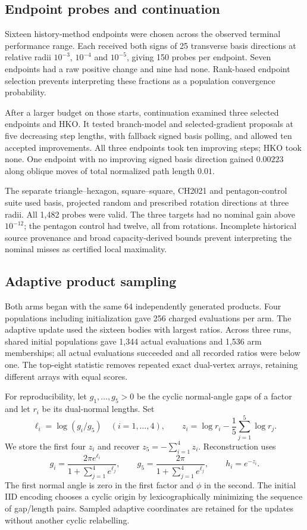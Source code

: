 \subsection{Endpoint probes and continuation}\label{app:ds-probes}

Sixteen history-method endpoints were chosen across the observed terminal
performance range. Each received both signs of 25 transverse basis
directions at relative radii $10^{-3}$, $10^{-4}$ and $10^{-5}$, giving
150 probes per endpoint. Seven endpoints had a raw positive change and
nine had none. Rank-based endpoint selection prevents interpreting these
fractions as a population convergence probability.

After a larger budget on those starts, continuation examined three
selected endpoints and HKO. It tested branch-model and selected-gradient
proposals at five decreasing step lengths, with fallback signed basis
polling, and allowed ten accepted improvements. All three endpoints took
ten improving steps; HKO took none. One endpoint with no improving signed
basis direction gained $0.00223$ along oblique moves of total normalized
path length $0.01$.

The separate triangle--hexagon, square--square, CH2021 and pentagon-control
suite used basis, projected random and prescribed rotation directions at
three radii. All 1,482 probes were valid. The three targets had no nominal
gain above $10^{-12}$; the pentagon control had twelve, all from rotations.
Incomplete historical source provenance and broad capacity-derived bounds
prevent interpreting the nominal misses as certified local maximality.

\FloatBarrier
\subsection{Adaptive product sampling}\label{app:ds-adaptive}

Both arms began with the same 64 independently generated products. Four
populations including initialization gave 256 charged evaluations per arm.
The adaptive update used the sixteen bodies with largest ratios. Across
three runs, shared initial populations gave 1,344 actual evaluations and
1,536 arm memberships; all actual evaluations succeeded and all recorded
ratios were below one. The top-eight statistic removes repeated exact
dual-vertex arrays, retaining different arrays with equal scores.

For reproducibility, let $g_1,\ldots,g_5>0$ be the cyclic normal-angle gaps
of a factor and let $r_i$ be its dual-normal lengths. Set
\[
 \ell_i=\log(g_i/g_5)\quad(i=1,\ldots,4),\qquad
 z_i=\log r_i-\frac15\sum_{j=1}^5\log r_j.
\]
We store the first four $z_i$ and recover $z_5=-\sum_{i=1}^4z_i$.
Reconstruction uses
\[
 g_i=\frac{2\pi e^{\ell_i}}{1+\sum_{j=1}^4e^{\ell_j}},\qquad
 g_5=\frac{2\pi}{1+\sum_{j=1}^4e^{\ell_j}},\qquad h_i=e^{-z_i}.
\]
The first normal angle is zero in the first factor and $\phi$ in the second.
The initial IID encoding chooses a cyclic origin by lexicographically
minimizing the sequence of gap/length pairs. Sampled adaptive coordinates
are retained for the updates without another cyclic relabelling.


